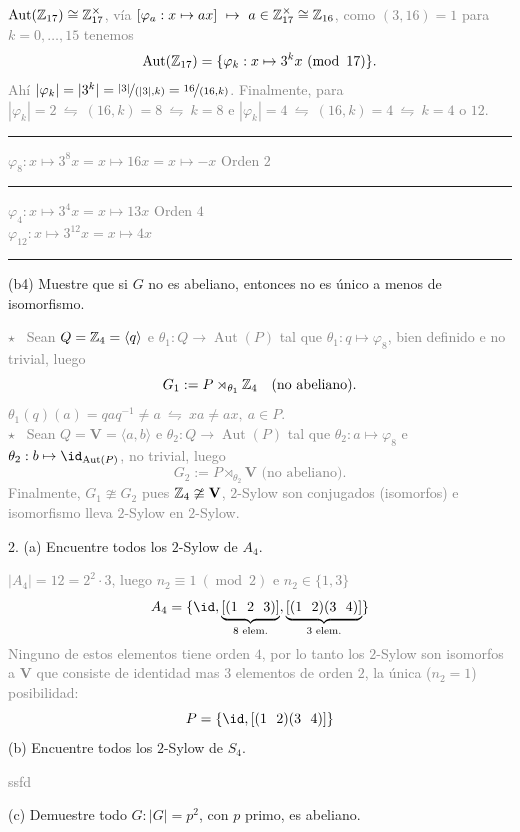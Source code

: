 \textcolor{gray}{
  \(\operatorname{Aut}(\mathbb{Z}_{17}) \cong \mathbb{Z}_{17}^\times \), vía \([\varphi_a : x \mapsto ax] \ \mapsto \ a\in \mathbb{Z}_{17}^\times\cong \mathbb{Z}_{16}\), como \((3,16) =1 \) para \(k= 0 ,\ldots, 15\) tenemos 
  \[\operatorname{Aut}(\mathbb{Z}_{17}) = \{\varphi_k: x \mapsto 3^k x  \ (\operatorname{mod} \ 17)\}.\]
  Ahí \(|\varphi_k| = |3^k| = \nicefrac{|3|}{(|3|,k)} = \nicefrac{16}{(16,k)}\). Finalmente, para \(|\varphi_k| = 2  \ \leftrightharpoons \ (16,k) = 8 \ \leftrightharpoons \ k=8\) e \(|\varphi_k| = 4 \ \leftrightharpoons \ (16, k) = 4 \ \leftrightharpoons \ k = 4\) o \( 12\).    \vspace{0.2cm}
  \hrule 
  \( \varphi_8 : x \mapsto 3^8 x = x\mapsto 16 x = x\mapsto -x \)  \hfill Orden $2$  \vspace{0.2cm}
  \hrule
  \( \varphi_4 : x \mapsto 3^4 x = x\mapsto 13 x  \) \hfill  Orden $4$  \vspace{0.2cm} \\ 
  \( \varphi_{12} : x \mapsto 3^{12} x = x\mapsto 4 x  \)  \vspace{0.2cm}
  \hrule
}
\vspace{0.2cm}
(b4) Muestre que si \(G\) no es abeliano, entonces no es único a menos de isomorfismo.   

\newcommand{\aut}{\operatorname{Aut}}
\textcolor{gray}{
  \(\star \) \ Sean \(Q = \mathbb{Z}_4 = \langle q\rangle \) e \(\theta_1 : Q \to \aut(P)\) tal que \(\theta_1: q \mapsto \varphi_{8}\), bien definido e no trivial, luego 
  \[G_1 := P \rtimes_{\theta_1} \mathbb{Z}_4 \text{ \ \ (no abeliano)}.\]
  \(\theta_1(q)(a) = q a q^{-1} \neq a \ \leftrightharpoons \ xa \neq ax, \ a \in P\). \vspace{0.2cm}\\ 
  \(\star \) \ Sean \(Q = \textbf{V} = \langle a,b\rangle \) e \(\theta_2 : Q \to \aut(P)\) tal que \(\theta_2 : a \mapsto \varphi_{8} \) e \(\theta_2 : b \mapsto \id_{\aut(P)}\), no trivial, luego   
  \[G_2 := P \rtimes_{\theta_2} \textbf{V} \text{ \ \ (no abeliano)}.\]
  Finalmente, \(G_1 \ncong G_2 \) pues \(\mathbb{Z}_4 \ncong \textbf{V}\), $2$-Sylow son conjugados (isomorfos) e isomorfismo lleva $2$-Sylow en $2$-Sylow. 
}
 
2. (a) Encuentre todos los $2$-Sylow de \(A_4\). 

\textcolor{gray}{
  \(|A_4| = 12 = 2^2 \cdot 3\), luego \(n_2 \equiv 1 \ (\operatorname{mod} \ 2)\) e \(n_2 \in \{1,3\}\)
  \[A_4 = \{\id, \underbrace{[(1 \ \ 2 \ \ 3)]}_{8 \text{ elem.}}, \underbrace{[(1 \ \ 2) (3 \ \ 4)]}_{3\text{ elem.}}\}\]
  Ninguno de estos elementos tiene orden $4$, por lo tanto los $2$-Sylow son isomorfos a \(\textbf{V}\) que consiste de identidad mas $3$ elementos de orden $2$, la única (\(n_2 = 1\)) posibilidad:  
  \[P = \{\id, [(1 \ \ 2)(3 \ \ 4)]\}\] 
}
(b) Encuentre todos los $2$-Sylow de \(S_4\). 

\textcolor{gray}{
  ssfd
}

(c) Demuestre todo \(G: |G| = p^2\), con \(p\) primo, es abeliano.